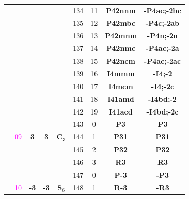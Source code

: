 \documentclass{article}      %
\begin{document}
\begin{small}
\begin{longtable}[c]{|c|c|c|c|c|c|c|c|c|}
          & & & & &\textrm{134} &\textrm{11} &\textbf{P42nnm}     &\textbf{-P4ac;-2bc}\\\cline{6-9}     
          & & & & &\textrm{135} &\textrm{12} &\textbf{P42mbc}     &\textbf{-P4c;-2ab}\\\cline{6-9}      
          & & & & &\textrm{136} &\textrm{13} &\textbf{P42mnm}     &\textbf{-P4n;-2n}\\\cline{6-9}       
          & & & & &\textrm{137} &\textrm{14} &\textbf{P42nmc}     &\textbf{-P4ac;-2a}\\\cline{6-9}      
          & & & & &\textrm{138} &\textrm{15} &\textbf{P42ncm}     &\textbf{-P4ac;-2ac}\\\cline{6-9}     
          & & & & &\textrm{139} &\textrm{16} &\textbf{I4mmm}     &\textbf{-I4;-2}\\\cline{6-9}          
          & & & & &\textrm{140} &\textrm{17} &\textbf{I4mcm}     &\textbf{-I4;-2c}\\\cline{6-9}         
          & & & & &\textrm{141} &\textrm{18} &\textbf{I41amd}     &\textbf{-I4bd;-2}\\\cline{6-9}       
          & & & & &\textrm{142} &\textrm{19} &\textbf{I41acd}     &\textbf{-I4bd;-2c}\\\hline
          & & & & &\textrm{143}  &\textrm{0} &\textbf{P3}         &\textbf{P3}\\\cline{6-9}             
	  &\textrm{\textcolor{magenta}{09}} &\textbf{3} &\textbf{3} &$\mathbf{C}_3$ &\textrm{144}  &\textrm{1} &\textbf{P31}   &\textbf{P31}\\\cline{6-9}      
	  & & & & &\textrm{145}  &\textrm{2} &\textbf{P32}         &\textbf{P32}\\\cline{6-9}           
          & & & & &\textrm{146}  &\textrm{3} &\textbf{R3}         &\textbf{R3}\\\cline{2-9}             
          & & & & &\textrm{147}  &\textrm{0} &\textbf{P-3}         &\textbf{-P3}\\\cline{6-9}           
	  & \textrm{\textcolor{magenta}{10}} &\textbf{-3} &\textbf{-3} &$\mathbf{S}_6$  &\textrm{148}  &\textrm{1} &\textbf{R-3}         &\textbf{-R3}\\\cline{2-9}           

\end{longtable}
\end{small}
\end{document}
